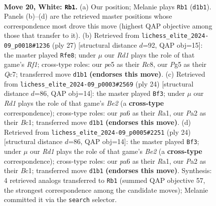 \documentclass[11pt]{article}
\begin{document}
\clearpage

\begin{figure}[p]\centering
\begin{subfigure}{0.46\textwidth}\centering
\resizebox{\linewidth}{!}{%
\newchessgame
\chessboard[
  setfen={rn2b2r/1pq2kbp/p2pp1p1/4p1Pn/4P3/2N1BP2/PPPK2QP/3RRB2 w - - 0 20},
  showmover=false,
  pgfstyle=straightmove, color=movearrow, markmove={d1-b1}
]}
\caption{}
\end{subfigure}\hfill
\begin{subfigure}{0.46\textwidth}\centering
\resizebox{\linewidth}{!}{%
\newchessgame
\chessboard[
  setfen={2r2rk1/ppqn1ppp/2nbp3/3p3b/P2P4/2P2N1P/1P2BPP1/R1BQRNK1 b - - 2 14},
  showmover=false,
  pgfstyle=straightmove, color=movearrow, markmove={f8-e8}
]}
\caption{}
\end{subfigure}
\\[4pt]
\begin{subfigure}{0.46\textwidth}\centering
\resizebox{\linewidth}{!}{%
\newchessgame
\chessboard[
  setfen={r1bq1rk1/1pp2pp1/3p1n1p/p1bP4/P2N4/2P4P/1P2BPP1/R1BQ1RK1 w - - 1 13},
  showmover=false,
  pgfstyle=straightmove, color=movearrow, markmove={e2-f3}
]}
\caption{}
\end{subfigure}\hfill
\begin{subfigure}{0.46\textwidth}\centering
\resizebox{\linewidth}{!}{%
\newchessgame
\chessboard[
  setfen={r1bq1rk1/1pp2pp1/3p1n1p/p1bP4/P2N4/2P4P/1P2BPP1/R1BQ1RK1 w - - 1 13},
  showmover=false,
  pgfstyle=straightmove, color=movearrow, markmove={e2-f3}
]}
\caption{}
\end{subfigure}
\caption{\textbf{Move 20, White: \texttt{Rb1}.} (a) Our position; Melanie plays \texttt{Rb1} (\texttt{d1b1}). Panels (b)--(d) are the retrieved master positions whose correspondence most drove this move (highest QAP objective among those that transfer to it). (b) Retrieved from \texttt{lichess\_elite\_2024-09\_p0018\#1236} (ply 27) [structural distance $d$=92, QAP obj=15]: the master played \texttt{Rfe8}; under $\mu$ our \emph{Rd1} plays the role of that game's \emph{Rf1}; cross-type roles: our \emph{p}e5 as their \emph{R}c8, our \emph{P}g5 as their \emph{Q}c7; transferred move \texttt{d1b1} \textbf{(endorses this move)}. (c) Retrieved from \texttt{lichess\_elite\_2024-09\_p0003\#2569} (ply 24) [structural distance $d$=86, QAP obj=14]: the master played \texttt{Bf3}; under $\mu$ our \emph{Rd1} plays the role of that game's \emph{Be2} (a \textbf{cross-type} correspondence); cross-type roles: our \emph{p}a6 as their \emph{R}a1, our \emph{P}a2 as their \emph{B}c1; transferred move \texttt{d1b1} \textbf{(endorses this move)}. (d) Retrieved from \texttt{lichess\_elite\_2024-09\_p0005\#2251} (ply 24) [structural distance $d$=86, QAP obj=14]: the master played \texttt{Bf3}; under $\mu$ our \emph{Rd1} plays the role of that game's \emph{Be2} (a \textbf{cross-type} correspondence); cross-type roles: our \emph{p}a6 as their \emph{R}a1, our \emph{P}a2 as their \emph{B}c1; transferred move \texttt{d1b1} \textbf{(endorses this move)}. Synthesis: 4 retrieved analogs transferred to \texttt{Rb1} (summed QAP objective 57, the strongest correspondence among the candidate moves); Melanie committed it via the \texttt{search} selector.}

\end{figure}
\end{document}
